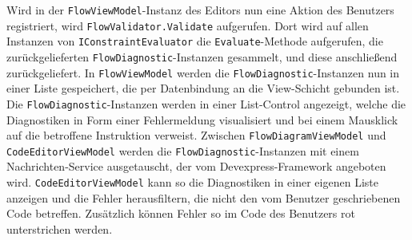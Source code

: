 Wird in der \texttt{FlowViewModel}-Instanz des Editors nun eine Aktion des Benutzers registriert, wird \texttt{FlowValidator.Validate} aufgerufen. Dort wird auf allen Instanzen von \texttt{IConstraintEvaluator} die \texttt{Evaluate}-Methode aufgerufen, die zurückgelieferten \texttt{FlowDiagnostic}-Instanzen gesammelt, und diese anschließend zurückgeliefert. In \texttt{FlowViewModel} werden die \texttt{FlowDiagnostic}-Instanzen nun in einer Liste gespeichert, die per Datenbindung an die View-Schicht gebunden ist. Die \texttt{FlowDiagnostic}-Instanzen werden in einer List-Control angezeigt, welche die Diagnostiken in Form einer Fehlermeldung visualisiert und bei einem Mausklick auf die betroffene Instruktion verweist. Zwischen \texttt{FlowDiagramViewModel} und \texttt{Code\-Edi\-tor\-View\-Mo\-del} werden die \texttt{FlowDiagnostic}-Instanzen mit einem Nachrichten-Service ausgetauscht, der vom Devexpress-Framework angeboten wird. \texttt{Code\-Edi\-tor\-View\-Mo\-del} kann so die Diagnostiken in einer eigenen Liste anzeigen und die Fehler herausfiltern, die nicht den vom Benutzer geschriebenen Code betreffen. Zusätzlich können Fehler so im Code des Benutzers rot unterstrichen werden.